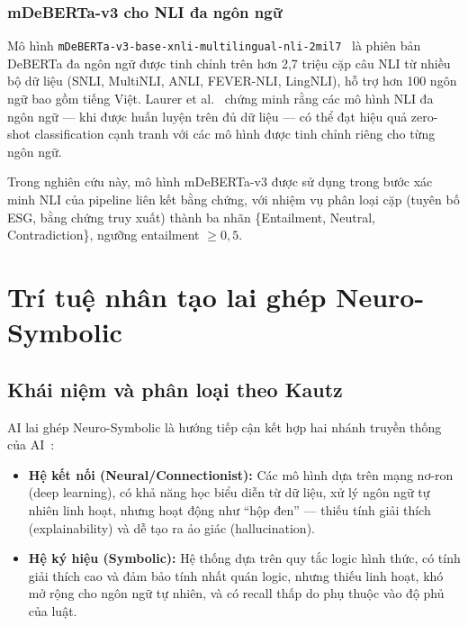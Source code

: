 \subsubsection{mDeBERTa-v3 cho NLI đa ngôn ngữ}

Mô hình \texttt{mDeBERTa-v3-base-xnli-multilingual-nli-2mil7}~\cite{laurer2023building} là phiên bản DeBERTa đa ngôn ngữ được tinh chỉnh trên hơn 2,7 triệu cặp câu NLI từ nhiều bộ dữ liệu (SNLI, MultiNLI, ANLI, FEVER-NLI, LingNLI), hỗ trợ hơn 100 ngôn ngữ bao gồm tiếng Việt. Laurer et al.~\cite{laurer2023building} chứng minh rằng các mô hình NLI đa ngôn ngữ --- khi được huấn luyện trên đủ dữ liệu --- có thể đạt hiệu quả zero-shot classification cạnh tranh với các mô hình được tinh chỉnh riêng cho từng ngôn ngữ.

Trong nghiên cứu này, mô hình mDeBERTa-v3 được sử dụng trong bước xác minh NLI của pipeline liên kết bằng chứng, với nhiệm vụ phân loại cặp (tuyên bố ESG, bằng chứng truy xuất) thành ba nhãn \{Entailment, Neutral, Contradiction\}, ngưỡng entailment $\geq 0{,}5$.


\section{Trí tuệ nhân tạo lai ghép Neuro-Symbolic}
\label{sec:neuro_symbolic}

\subsection{Khái niệm và phân loại theo Kautz}
\label{subsec:neuro_symbolic_overview}

AI lai ghép Neuro-Symbolic là hướng tiếp cận kết hợp hai nhánh truyền thống của AI~\cite{kautz2022third}:

\begin{itemize}
    \item \textbf{Hệ kết nối (Neural/Connectionist):} Các mô hình dựa trên mạng nơ-ron (deep learning), có khả năng học biểu diễn từ dữ liệu, xử lý ngôn ngữ tự nhiên linh hoạt, nhưng hoạt động như ``hộp đen'' --- thiếu tính giải thích (explainability) và dễ tạo ra ảo giác (hallucination).
    \item \textbf{Hệ ký hiệu (Symbolic):} Hệ thống dựa trên quy tắc logic hình thức, có tính giải thích cao và đảm bảo tính nhất quán logic, nhưng thiếu linh hoạt, khó mở rộng cho ngôn ngữ tự nhiên, và có recall thấp do phụ thuộc vào độ phủ của luật.
\end{itemize}

